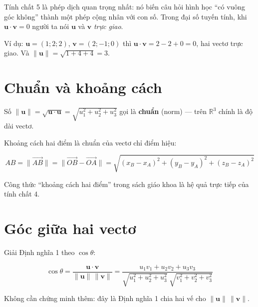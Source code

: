 \documentclass[12pt,a4paper]{article}
\begin{document}
Tính chất 5 là phép dịch quan trọng nhất: nó biến câu hỏi hình học ``có vuông góc không'' thành một phép cộng nhân với con số. Trong đại số tuyến tính, khi $\mathbf{u}\cdot\mathbf{v}=0$ người ta nói $\mathbf{u}$ và $\mathbf{v}$ \emph{trực giao}.

Ví dụ: $\mathbf{u}=(1;2;2)$, $\mathbf{v}=(2;-1;0)$ thì $\mathbf{u}\cdot\mathbf{v} = 2-2+0 = 0$, hai vectơ trực giao. Và $\|\mathbf{u}\| = \sqrt{1+4+4} = 3$.

\section{Chuẩn và khoảng cách}

Số $\|\mathbf{u}\| = \sqrt{\mathbf{u}\cdot\mathbf{u}} = \sqrt{u_1^2+u_2^2+u_3^2}$ gọi là \textbf{chuẩn} (norm) --- trên $\mathbb{R}^3$ chính là độ dài vectơ.

Khoảng cách hai điểm là chuẩn của vectơ chỉ điểm hiệu:

$$
AB = \|\overrightarrow{AB}\| = \|\overrightarrow{OB}-\overrightarrow{OA}\|
= \sqrt{(x_B-x_A)^2 + (y_B-y_A)^2 + (z_B-z_A)^2}
$$

Công thức ``khoảng cách hai điểm'' trong sách giáo khoa là hệ quả trực tiếp của tính chất 4.

\section{Góc giữa hai vectơ}

Giải Định nghĩa 1 theo $\cos\theta$:

$$
\boxed{\;\cos\theta = \frac{\mathbf{u} \cdot \mathbf{v}}{\|\mathbf{u}\|\,\|\mathbf{v}\|}
= \frac{u_1v_1 + u_2v_2 + u_3v_3}{\sqrt{u_1^2+u_2^2+u_3^2}\;\sqrt{v_1^2+v_2^2+v_3^2}}\;}
$$

Không cần chứng minh thêm: đây là Định nghĩa 1 chia hai vế cho $\|\mathbf{u}\|\,\|\mathbf{v}\|$.

\begin{center}
\end{center}
\end{document}
